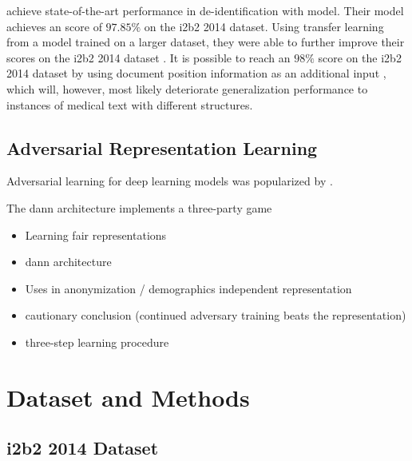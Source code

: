 %
\citet{dernoncourt2017identification} achieve state-of-the-art performance in de-identification with  model.
%
Their model achieves an \fone score of $97.85\%$ on the i2b2 2014 dataset.
%
Using transfer learning from a model trained on a larger dataset, they were able to further improve their scores on the i2b2 2014 dataset \citep{lee2017transfer}.
%
It is possible to reach an $98\%$ \fone score on the i2b2 2014 dataset by using document position information as an additional input \citep{zhao2018leveraging}, which will, however, most likely deteriorate generalization performance to instances of medical text with different structures.

\subsection{Adversarial Representation Learning}
%
Adversarial learning for deep learning models was popularized by \citet{goodfellow2014generative}.
%

The \ac{dann} architecture \citep{ganin2016domain} implements a three-party game 

\begin{itemize}
    \item Learning fair representations \citep{zemel2013learning}
    \item \Ac{dann} architecture \citep{ganin2016domain}
    \item Uses in anonymization / demographics independent representation \citet{elazar2018adversarial,li2018towards}
    \item \citet{elazar2018adversarial} cautionary conclusion (continued adversary training beats the representation)
    \item \citet{feutry2018learning} three-step learning procedure
\end{itemize}

\section{Dataset and Methods}

\subsection{i2b2 2014 Dataset}

